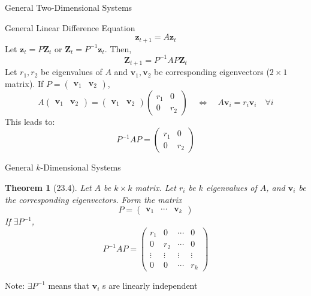 \documentclass[a4paper,11pt]{article}
\newtheorem{thm}{Theorem}
\newcommand{\bd}{\mathbf}
\begin{document}
\begin{frame}[t]{General Two-Dimensional Systems}
	\begin{block}
		{General Linear Difference Equation}
		\[
			\bd{z}_{t+1}=A\bd{z}_t
		\]
		Let $\bd{z}_t=P\bd{Z}_t$ or $\bd{Z}_t=P^{-1}\bd{z}_t$. Then,
		\[
			\bd{Z}_{t+1} = P^{-1}AP\bd{Z}_t
		\]
		Let $r_1,r_2$ be eigenvalues of $A$ and $\bd{v}_1, \bd{v}_2$ be corresponding eigenvectors ($2\times 1$ matrix). If $P=\begin{pmatrix}
			\bd{v}_1 & \bd{v}_2
		\end{pmatrix}$, \[
			A\begin{pmatrix}
			\bd{v}_1 & \bd{v}_2
		\end{pmatrix} = \begin{pmatrix}
			\bd{v}_1 & \bd{v}_2
		\end{pmatrix} \begin{pmatrix}
			r_1 & 0\\
			0 & r_2
		\end{pmatrix} \quad\iff\quad A\bd{v}_i = r_i\bd{v}_i\quad\forall i \tag{Th23.3}
		\]
		This leads to: \[
			P^{-1}AP = \begin{pmatrix}
			r_1 & 0\\
			0 & r_2
		\end{pmatrix}
		\]
	\end{block}
\end{frame}

\begin{frame}[t]{General $k$-Dimensional Systems}
	\begin{thm}
		[23.4] Let $A$ be $k\times k$ matrix. Let $r_i$ be $k$ eigenvalues of $A$, and $\bd{v}_i$ be the corresponding eigenvectors. Form the matrix\[
			P = \begin{pmatrix}
				\bd{v}_1 & \cdots & \bd{v}_k
			\end{pmatrix}
		\]If $\exists P^{-1}$, \[
			P^{-1}AP = \begin{pmatrix}
				r_1 & 0 & \cdots & 0\\
				0 & r_2 & \cdots & 0\\
				\vdots & \vdots & \vdots & \vdots\\
				0 & 0 & \cdots & r_k
			\end{pmatrix}
		\]
	\end{thm}
	Note: $\exists P^{-1}$ means that $\bd{v}_i$ s are linearly independent
\end{frame}
\end{document}
